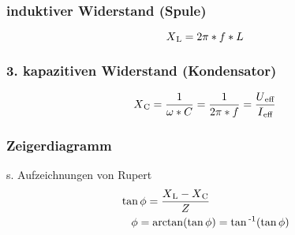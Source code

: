 \documentclass{scrartcl}
\begin{document}
                \subsubsection{induktiver Widerstand (Spule)}
                \begin{equation}
                    X\textsubscript{L}=2\pi*f*L
                \end{equation}
                \subsubsection*{3. kapazitiven Widerstand (Kondensator)}
                \begin{equation}
                    X\textsubscript{C}= \frac{1}{\omega*C}=\frac{1}{2\pi*f}=\frac{U\textsubscript{eff}}{I\textsubscript{eff}}
                \end{equation}
                \subsubsection{Zeigerdiagramm}
                    s. Aufzeichnungen von Rupert
                    \begin{equation}
                        \begin{multlined}
                            \tan\phi=\frac{X\textsubscript{L}-X\textsubscript{C}}{Z} \\
                            \phi = \arctan(\tan\phi) = \tan\textsuperscript{-1}(\tan\phi)
                        \end{multlined}
                    \end{equation}
\end{document}
